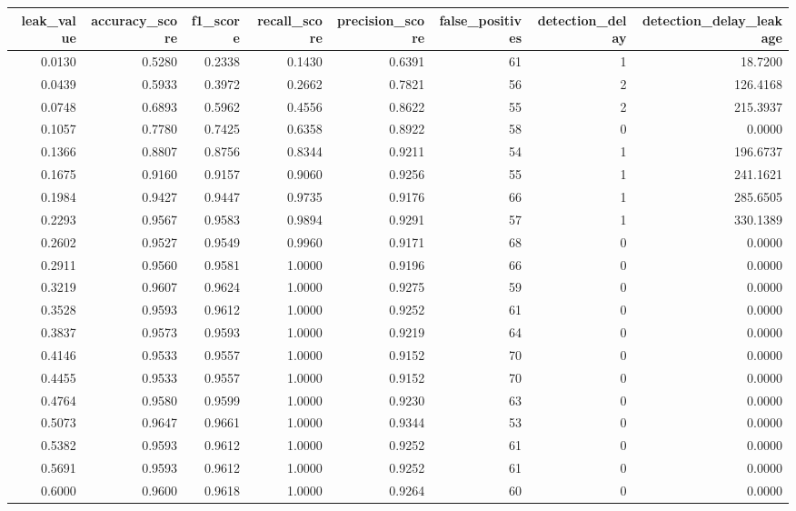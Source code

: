 \begin{tabular}{rrrrrrrr}
\toprule
leak\_value & accuracy\_score & f1\_score & recall\_score & precision\_score & false\_positives & detection\_delay & detection\_delay\_leakage \\
\midrule
0.0130 & 0.5280 & 0.2338 & 0.1430 & 0.6391 & 61 & 1 & 18.7200 \\
0.0439 & 0.5933 & 0.3972 & 0.2662 & 0.7821 & 56 & 2 & 126.4168 \\
0.0748 & 0.6893 & 0.5962 & 0.4556 & 0.8622 & 55 & 2 & 215.3937 \\
0.1057 & 0.7780 & 0.7425 & 0.6358 & 0.8922 & 58 & 0 & 0.0000 \\
0.1366 & 0.8807 & 0.8756 & 0.8344 & 0.9211 & 54 & 1 & 196.6737 \\
0.1675 & 0.9160 & 0.9157 & 0.9060 & 0.9256 & 55 & 1 & 241.1621 \\
0.1984 & 0.9427 & 0.9447 & 0.9735 & 0.9176 & 66 & 1 & 285.6505 \\
0.2293 & 0.9567 & 0.9583 & 0.9894 & 0.9291 & 57 & 1 & 330.1389 \\
0.2602 & 0.9527 & 0.9549 & 0.9960 & 0.9171 & 68 & 0 & 0.0000 \\
0.2911 & 0.9560 & 0.9581 & 1.0000 & 0.9196 & 66 & 0 & 0.0000 \\
0.3219 & 0.9607 & 0.9624 & 1.0000 & 0.9275 & 59 & 0 & 0.0000 \\
0.3528 & 0.9593 & 0.9612 & 1.0000 & 0.9252 & 61 & 0 & 0.0000 \\
0.3837 & 0.9573 & 0.9593 & 1.0000 & 0.9219 & 64 & 0 & 0.0000 \\
0.4146 & 0.9533 & 0.9557 & 1.0000 & 0.9152 & 70 & 0 & 0.0000 \\
0.4455 & 0.9533 & 0.9557 & 1.0000 & 0.9152 & 70 & 0 & 0.0000 \\
0.4764 & 0.9580 & 0.9599 & 1.0000 & 0.9230 & 63 & 0 & 0.0000 \\
0.5073 & 0.9647 & 0.9661 & 1.0000 & 0.9344 & 53 & 0 & 0.0000 \\
0.5382 & 0.9593 & 0.9612 & 1.0000 & 0.9252 & 61 & 0 & 0.0000 \\
0.5691 & 0.9593 & 0.9612 & 1.0000 & 0.9252 & 61 & 0 & 0.0000 \\
0.6000 & 0.9600 & 0.9618 & 1.0000 & 0.9264 & 60 & 0 & 0.0000 \\
\bottomrule
\end{tabular}

